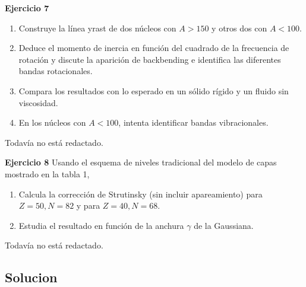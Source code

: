 \begin{texercise}
    \textbf{Ejercicio 7}
    \begin{enumerate}
        \item Construye la línea yrast de dos núcleos con $A>150$ y otros dos con $A<100$.
        \item Deduce el momento de inercia en función del cuadrado de la frecuencia de rotación y discute la aparición de backbending e identifica las diferentes bandas rotacionales.
        \item Compara los resultados con lo esperado en un sólido rígido y un fluido sin viscosidad.
        \item En los núcleos con $A<100$, intenta identificar bandas vibracionales.
    \end{enumerate}
\tcblower
Todavía no está redactado.
\end{texercise}

\begin{texercise}
    \textbf{Ejercicio 8}
    Usando el esquema de niveles tradicional del modelo de capas mostrado en la tabla 1,
    \begin{enumerate}
        \item Calcula la corrección de Strutinsky (sin incluir apareamiento) para $Z=50, N=82$ y para $Z=40, N=68$.
        \item Estudia el resultado en función de la anchura $\gamma$ de la Gaussiana.
    \end{enumerate}
\tcblower
Todavía no está redactado.
\end{texercise}


\tcbstoprecording


\subsection{Solucion}
\tcbinputrecords